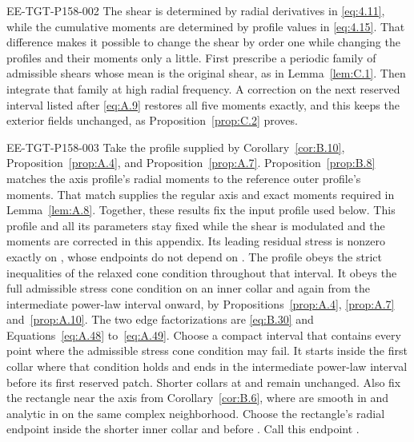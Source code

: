 \begin{EESegment}{EE-TGT-P158-002}
The shear is determined by radial derivatives in \eqref{eq:4.11}, while the cumulative moments
 are determined by profile values in \eqref{eq:4.15}. That difference makes it possible to change the shear by order one while changing the profiles and their moments only a little. First prescribe a periodic family of admissible shears  whose mean is the original shear, as in Lemma~\ref{lem:C.1}. Then integrate that family at high radial frequency. A correction on the next reserved
interval listed after \eqref{eq:A.9} restores all five moments exactly, and this keeps the exterior
fields unchanged, as Proposition~\ref{prop:C.2} proves.
\end{EESegment}

\begin{EESegment}{EE-TGT-P158-003}
Take the profile supplied by Corollary~\ref{cor:B.10}, Proposition~\ref{prop:A.4}, and Proposition~\ref{prop:A.7}.
Proposition~\ref{prop:B.8} matches the axis profile's radial moments to the reference outer profile's moments. That match supplies the regular axis and exact moments required in Lemma~\ref{lem:A.8}. Together, these results fix the input profile  used below. This profile and all its parameters stay fixed while the shear is modulated and the moments are corrected in this appendix. Its leading residual stress  is nonzero exactly on
, whose endpoints do not depend on . The profile obeys the strict inequalities of the relaxed cone condition
throughout that interval. It obeys the full admissible stress cone condition on an inner collar and again from the intermediate power-law interval onward, by Propositions~\ref{prop:A.4}, \ref{prop:A.7} and~\ref{prop:A.10}. The two
edge factorizations are \eqref{eq:B.30} and Equations~\eqref{eq:A.48} to~\eqref{eq:A.49}. Choose a compact interval
 that contains every point where the admissible stress cone condition
may fail. It starts inside the first collar where that condition holds and ends in the intermediate power-law interval before its first reserved patch. Shorter
collars at  and  remain unchanged. Also fix the rectangle near the axis from
Corollary~\ref{cor:B.6}, where  are smooth in
 and analytic in  on the same
complex neighborhood. Choose the rectangle's radial endpoint inside the shorter inner collar and before . Call this endpoint .
\end{EESegment}

